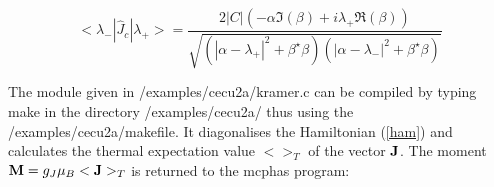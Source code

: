 \begin{equation}
<\lambda_-|\hat J_c|\lambda_+>=
\frac{2|C| (-\alpha\Im(\beta)+i\lambda_+ \Re(\beta))}
{\sqrt{(|\alpha-\lambda_{+}|^2+\beta^{\star}\beta)
(|\alpha-\lambda_{-}|^2+\beta^{\star}\beta)}}
\end{equation}

The module given in {\prg /examples/cecu2a/kramer.c} can be compiled
by typing make in the directory {\prg /examples/cecu2a/} thus using the
{\prg  /examples/cecu2a/makefile}. It diagonalises
the Hamiltonian (\ref{ham}) and calculates the thermal expectation 
value $<>_T$ of the vector $\mathbf J$. The moment ${\mathbf M}=g_J \mu_B <{\mathbf J}>_T$
is returned to the mcphas program:


